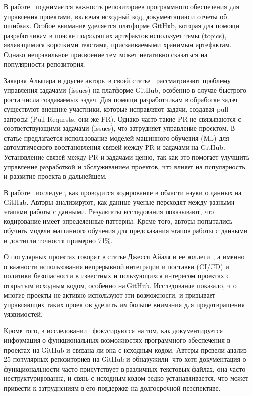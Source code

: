 В работе~\cite{RoccoRSNR23} поднимается важность репозиториев программного обеспечения для управления проектами, включая исходный код, документацию и отчеты об ошибках. Особое внимание уделяется платформе GitHub, которая для помощи разработчикам в поиске подходящих артефактов использует темы (topics), являющимися короткими текстами, присваиваемыми хранимым артефактам. Однако неправильное присвоение тем может негативно сказаться на популярности репозитория. 

Закария Альшара и другие авторы в своей статье~\cite{AlsharaSSS23} рассматривают проблему управления задачами (issues) на платформе GitHub, особенно в случае быстрого роста числа создаваемых задач. Для помощи разработчикам в обработке задач существуют внешние участники, которые исправляют задачи, создавая pull-запросы (Pull Requests, они же PR). Однако часто такие PR не связываются с соответствующими задачами (issues), что затрудняет управление проектом. В статье предлагается использование моделей машинного обучения (ML) для автоматического восстановления связей между PR и задачами на GitHub. Установление связей между PR и задачами ценно, так как это помогает улучшить управление разработкой и обслуживанием проектов, что влияет на популярность и развитие проекта в дальнейшем.

В работе~\cite{RamasamySBB23} исследует, как проводится кодирование в области науки о данных на GitHub. Авторы анализируют, как данные ученые переходят между разными этапами работы с данными. Результаты исследования показывают, что кодирование имеет определенные паттерны. Кроме того, авторы попытались обучить модели машинного обучения для предсказания этапов работы с данными и достигли точности примерно 71\%.

О популярных проектах говорят в статье Джесси Айала и ее коллеги~\cite{AyalaG23}, а именно о важности использования непрерывной интеграции и поставки (CI/CD) и политики безопасности в известных и пользующихся интересом проектах с открытым исходным кодом, особенно на GitHub. Исследование показало, что многие проекты не активно используют эти возможности, и призывает управляющих таких проектов уделить им больше внимания для предотвращения уязвимостей. 

Кроме того, в исследовании~\cite{PuhlfurssMM22} фокусируются на том, как документируется информация о функциональных возможностях программного обеспечения в проектах на GitHub и связана ли она с исходным кодом. Авторы провели анализ 25 популярных репозиториев на GitHub и обнаружили, что хотя документация о функциональности часто присутствует в различных текстовых файлах, она часто неструктурированна, и связь с исходным кодом редко устанавливается, что может привести к затруднениям в его поддержке на долгосрочной перспективе. 

